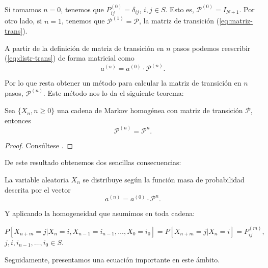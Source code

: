 \begin{observacion}
    Si tomamos $n=0$, tenemos que $P^{(0)}_{ij}=\delta_{ij}$, $i,j\in S$. Esto es, $\mathcal P^{(0)}=I_{N+1}$. Por otro lado, si $n=1$, tenemos que $\mathcal P^{(1)}=\mathcal P$, la matriz de transición (\ref{eq:matriz-trans}).
\end{observacion}

A partir de la definición de matriz de transición en $n$ pasos podemos reescribir (\ref{eq:distr-trans}) de forma matricial como
$$
a^{(n)}= a^{(0)} \cdot \mathcal P^{(n)}.
$$

Por lo que resta obtener un método para calcular la matriz de transición en $n$ pasos, $\mathcal P^{(n)}$. Este método nos lo da el siguiente teorema:

\begin{teorema}
    \label{th:matriz-trans-n}
    Sea $\{X_n,n\geq 0\}$ una cadena de Markov homogénea con matriz de transición $\mathcal P$, entonces
    \begin{equation}
        \label{eq:matriz-trans-n-teorema}
        \mathcal P^{(n)} = \mathcal P^n.
    \end{equation}    
\end{teorema}
\begin{proof}
    Consúltese \cite[Ch. II, theorem 2.2]{kulkarni-2012}.
\end{proof}

De este resultado obtenemos dos sencillas consecuencias:

\begin{corolario}
    \label{cor:fmp}
    La variable aleatoria $X_n$ se distribuye según la función masa de probabilidad descrita por el vector 
    $$
    a^{(n)} = a^{(0)}\cdot \mathcal P^n.
    $$
\end{corolario}

Y aplicando la homogeneidad que asumimos en toda cadena:

\begin{corolario}
    \label{cor:Pnm}
    $$
    P[X_{n+m}=j|X_n=i,X_{n-1}=i_{n-1},\dots,X_0=i_0] = P[X_{n+m}=j|X_n=i]=P_{ij}^{(m)},
    $$
$j,i,i_{n-1},\dots,i_0\in S$.
\end{corolario}

Seguidamente, presentamos una ecuación importante en este ámbito.

